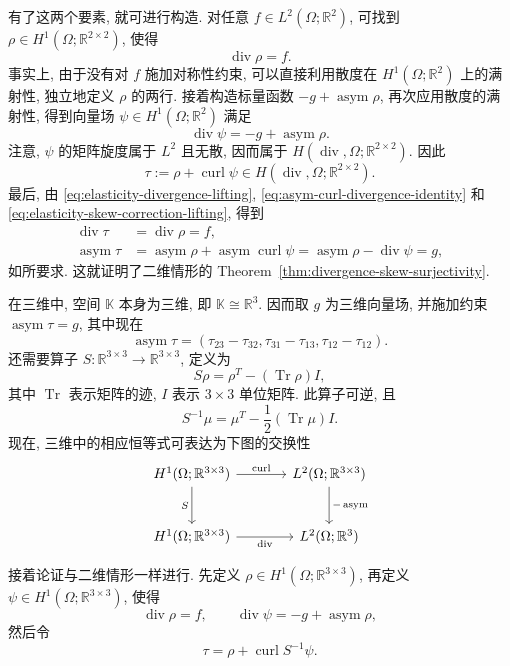 \begin{Proof}
{有了这两个要素, 就可进行构造. 对任意 $f\in L^2(\Omega;\mathbb R^2)$, 可找到 $\rho\in H^1(\Omega;\mathbb R^{2\times2})$, 使得}
\begin{equation}\label{eq:elasticity-divergence-lifting}
\operatorname{div}\rho=f.
\end{equation}
{事实上, 由于没有对 $f$ 施加对称性约束, 可以直接利用散度在 $H^1(\Omega;\mathbb R^2)$ 上的满射性, 独立地定义 $\rho$ 的两行. 接着构造标量函数 $-g+\operatorname{asym}\rho$, 再次应用散度的满射性, 得到向量场 $\psi\in H^1(\Omega;\mathbb R^2)$ 满足}
\begin{equation}\label{eq:elasticity-skew-correction-lifting}
\operatorname{div}\psi=-g+\operatorname{asym}\rho.
\end{equation}
{注意, $\psi$ 的矩阵旋度属于 $L^2$ 且无散, 因而属于 $H(\operatorname{div},\Omega;\mathbb R^{2\times2})$. 因此}
\[
\tau:=\rho+\operatorname{curl}\psi\in H(\operatorname{div},\Omega;\mathbb R^{2\times2}).
\]
{最后, 由 \eqref{eq:elasticity-divergence-lifting}, \eqref{eq:asym-curl-divergence-identity} 和 \eqref{eq:elasticity-skew-correction-lifting}, 得到}
\[
\begin{aligned}
\operatorname{div}\tau&=\operatorname{div}\rho=f,\\
\operatorname{asym}\tau&=\operatorname{asym}\rho+\operatorname{asym}\operatorname{curl}\psi=\operatorname{asym}\rho-\operatorname{div}\psi=g,
\end{aligned}
\]
{如所要求. 这就证明了二维情形的 Theorem~\ref{thm:divergence-skew-surjectivity}.}

{在三维中, 空间 $\mathbb K$ 本身为三维, 即 $\mathbb K\cong\mathbb R^3$. 因而取 $g$ 为三维向量场, 并施加约束 $\operatorname{asym}\tau=g$, 其中现在}
\[
\operatorname{asym}\tau=(\tau_{23}-\tau_{32},\tau_{31}-\tau_{13},\tau_{12}-\tau_{12}).
\]
{还需要算子 $S:\mathbb R^{3\times3}\to\mathbb R^{3\times3}$, 定义为}
\[
S\rho=\rho^T-(\operatorname{Tr}\rho)I,
\]
{其中 $\operatorname{Tr}$ 表示矩阵的迹, $I$ 表示 $3\times3$ 单位矩阵. 此算子可逆, 且}
\[
S^{-1}\mu=\mu^T-\frac12(\operatorname{Tr}\mu)I.
\]
{现在, 三维中的相应恒等式可表达为下图的交换性}
\[
\begin{tikzcd}[column sep=large,row sep=large]
H^1(\Omega;\mathbb R^{3\times3})\arrow[r,"\operatorname{curl}"]\arrow[d,"S"']&L^2(\Omega;\mathbb R^{3\times3})\arrow[d,"-\operatorname{asym}"]\\
H^1(\Omega;\mathbb R^{3\times3})\arrow[r,"\operatorname{div}"']&L^2(\Omega;\mathbb R^3)
\end{tikzcd}
\]

{接着论证与二维情形一样进行. 先定义 $\rho\in H^1(\Omega;\mathbb R^{3\times3})$, \newline 再定义 $\psi\in H^1(\Omega;\mathbb R^{3\times3})$, 使得}
\[
\operatorname{div}\rho=f,\qquad\operatorname{div}\psi=-g+\operatorname{asym}\rho,
\]
{然后令}
\[
\tau=\rho+\operatorname{curl}S^{-1}\psi.
\]
\end{Proof}

